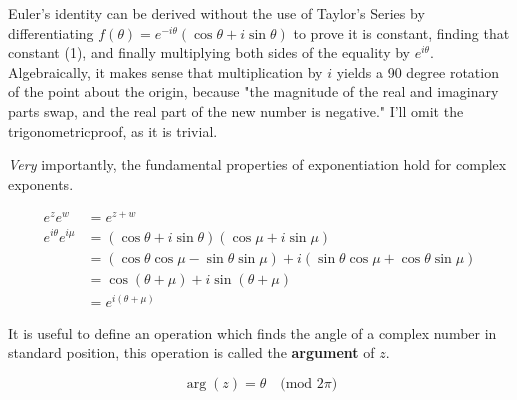 \documentclass{book}
\begin{document}
\vspace{10pt}

Euler's identity can be derived without the use of Taylor's Series by differentiating $f(\theta)=e^{-i\theta}(\cos\theta+i\sin\theta)$ to prove it is constant, finding that constant (1), and finally multiplying both sides of the equality by $e^{i\theta}$. Algebraically, it makes sense that multiplication by $i$ yields a 90 degree rotation of the point about the origin, because "the magnitude of the real and imaginary parts swap, and the real part of the new number is negative." I'll omit the trigonometricproof, as it is trivial.

\begin{center}
\end{center}

\newpage

\textit{Very} importantly, the fundamental properties of exponentiation hold for complex exponents.

\begin{align*}
e^ze^w&=e^{z+w}\\
e^{i\theta}e^{i\mu}&=(\cos\theta+i\sin\theta)(\cos\mu+i\sin\mu)\\
&=(\cos\theta\cos\mu-\sin\theta\sin\mu)+i(\sin\theta\cos\mu+\cos\theta\sin\mu)\\
&=\cos(\theta+\mu)+i\sin(\theta+\mu)\\
&=e^{i(\theta+\mu)}
\end{align*}

\vspace{10pt}

It is useful to define an operation which finds the angle of a complex number in standard position, this operation is called the {\bf{}argument} of $z$.

\[\arg(z)=\theta\quad\mbox{(mod 2$\pi$)}\]
\end{document}
